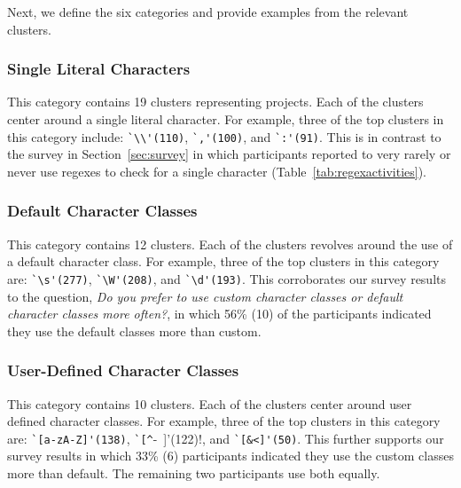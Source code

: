 Next, we define the six categories and provide examples from the relevant clusters.

\subsubsection{Single Literal Characters}
This category contains 19 clusters representing  projects. Each of the clusters center around a single literal character. For example, three of the top clusters in this category include:
\verb!`\\'(110)!, \verb!`,'(100)!, and \verb!`:'(91)!. This is in contrast to the survey in Section~\ref{sec:survey} in which participants reported to very rarely or never use regexes to check for a single character (Table~\ref{tab:regexactivities}).

\subsubsection{Default Character Classes}
This category contains 12 clusters. Each of the clusters revolves around the use of a default character class. For example, three of the top clusters in this category are:
\verb!`\s'(277)!, \verb!`\W'(208)!, and \verb!`\d'(193)!. This corroborates our survey results to the question, \emph{Do you prefer to use custom character classes or default character classes more often?}, in which 56\% (10) of the participants indicated they use the default classes more than custom.

\subsubsection{User-Defined Character Classes}
This category contains 10 clusters. Each of the clusters center around user defined character classes. For example, three of the top clusters in this category are:
\verb!`[a-zA-Z]'(138)!, \verb!`[^!-~]'(122)!, and \verb!`[&<]'(50)!. This further supports our survey results in which 33\% (6) participants indicated they use the custom classes more than default. The remaining two participants use both equally.


